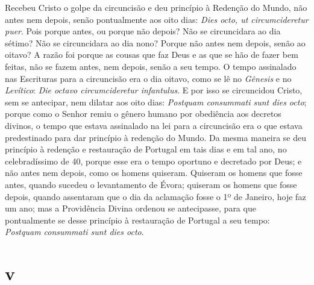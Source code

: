 Recebeu Cristo o golpe da circuncisão e deu princípio à Redenção do
Mundo, não antes nem depois, senão pontualmente aos oito dias:
\emph{Dies octo, ut circumcideretur puer}. Pois porque antes, ou porque
não depois? Não se circuncidara ao dia sétimo? Não se circuncidara ao
dia nono? Porque não antes nem depois, senão ao oitavo? A razão foi
porque as cousas que faz Deus e as que se hão de fazer bem feitas, não
se fazem antes, nem depois, senão a seu tempo. O tempo assinalado nas
Escrituras para a circuncisão era o dia oitavo, como se lê no
\emph{Gênesis} e no \emph{Levítico}: \emph{Die octavo circumcideretur
infantulus}. E por isso se circuncidou Cristo, sem se antecipar, nem
dilatar aos oito dias: \emph{Postquam consummati sunt dies octo}; porque
como o Senhor remiu o gênero humano por obediência aos decretos divinos,
o tempo que estava assinalado na lei para a circuncisão era o que estava
predestinado para dar princípio à redenção do Mundo. Da mesma maneira se
deu princípio à redenção e restauração de Portugal em tais dias e em tal
ano, no celebradíssimo de 40, porque esse era o tempo oportuno e
decretado por Deus; e não antes nem depois, como os homens quiseram.
Quiseram os homens que fosse antes, quando sucedeu o levantamento de
Évora; quiseram os homens que fosse depois, quando assentaram que o dia
da aclamação fosse o 1º de Janeiro, hoje faz um ano; mas a Providência
Divina ordenou se antecipasse, para que pontualmente se desse princípio
à restauração de Portugal a seu tempo: \emph{Postquam consummati sunt
dies octo}.

\section{v}

